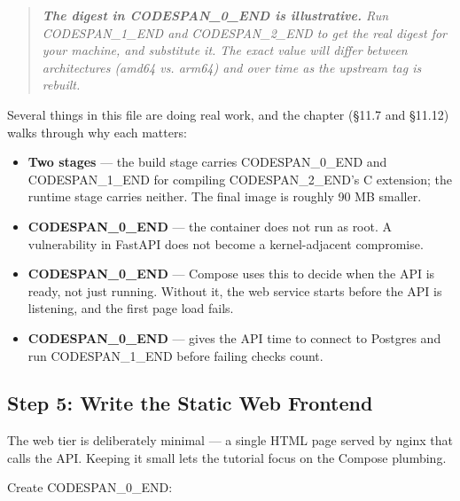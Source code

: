 \documentclass[11pt,a4paper]{book}
\begin{document}
\begin{quote}
\textit{\textbf{The digest in CODESPAN\_0\_END is illustrative.} Run CODESPAN\_1\_END and CODESPAN\_2\_END to get the real digest for your machine, and substitute it. The exact value will differ between architectures (amd64 vs. arm64) and over time as the upstream tag is rebuilt.}
\end{quote}

Several things in this file are doing real work, and the chapter (§11.7 and §11.12) walks through why each matters:

\begin{itemize}
  \item \textbf{Two stages} --- the build stage carries CODESPAN\_0\_END and CODESPAN\_1\_END for compiling CODESPAN\_2\_END's C extension; the runtime stage carries neither. The final image is roughly 90 MB smaller.
  \item \textbf{CODESPAN\_0\_END} --- the container does not run as root. A vulnerability in FastAPI does not become a kernel-adjacent compromise.
  \item \textbf{CODESPAN\_0\_END} --- Compose uses this to decide when the API is ready, not just running. Without it, the web service starts before the API is listening, and the first page load fails.
  \item \textbf{CODESPAN\_0\_END} --- gives the API time to connect to Postgres and run CODESPAN\_1\_END before failing checks count.
\end{itemize}

\medskip

\subsection{Step 5: Write the Static Web Frontend}

The web tier is deliberately minimal --- a single HTML page served by nginx that calls the API. Keeping it small lets the tutorial focus on the Compose plumbing.

Create CODESPAN\_0\_END:
\end{document}
